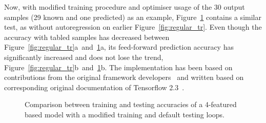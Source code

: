%
%
Now, with modified training procedure and optimiser usage of the 30 output samples (29 known and one predicted) as an example, \mbox{Figure~\ref{fig:modefied_tr}} contains a similar test, as without autoregression on earlier Figure~\ref{fig:regular_tr}.
Even though the accuracy with tabled samples has decreased between \mbox{Figure~\ref{fig:regular_tr}a and~\ref{fig:modefied_tr}a}, its feed-forward prediction accuracy has significantly increased and does not lose the trend, \mbox{Figure~\ref{fig:regular_tr}b and~\ref{fig:modefied_tr}b}.
The implementation has been based on contributions from the original framework developers~\cite{time_2020} and written based on corresponding original documentation of Tensorflow 2.3~\cite{tensorflow2015-whitepaper}.
 {
\begin{figure}[!t]
    \centering
    \label{subfig:modefied_tr}
    \label{subfig:modefied_ts}
    \caption{Comparison between training and testing accuracies of a 4-featured based model with a modified training and default testing loops.}
    \label{fig:modefied_tr}
\end{figure}
}
